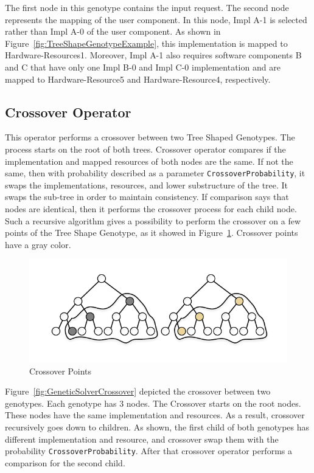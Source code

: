 The first node in this genotype contains the input request. The second node represents the mapping of the user component. In this node, Impl A-1 is selected rather than Impl A-0 of the user component. As shown in Figure~\ref{fig:TreeShapeGenotypeExample}, this implementation is mapped to Hardware-Resources1. Moreover, Impl A-1 also requires software components B and C that have only one Impl B-0 and Impl C-0 implementation and are mapped to Hardware-Resource5 and Hardware-Resource4, respectively.

\subsection{Crossover Operator}
\label{sec:GeneticSolverCrossover}

This operator performs a crossover between two Tree Shaped Genotypes. The process starts on the root of both trees. Crossover operator compares if the implementation and mapped resources of both nodes are the same. If not the same, then with probability described as a parameter \texttt{CrossoverProbability}, it swaps the implementations, resources, and lower substructure of the tree. It swaps the sub-tree in order to maintain consistency. If comparison says that nodes are identical, then it performs the crossover process for each child node. Such a recursive algorithm gives a possibility to perform the crossover on a few points of the Tree Shape Genotype, as it showed in Figure~\ref{fig:CrossoverPoints}. Crossover points have a gray color.

\begin{figure}
	\centering
	\includegraphics[width=\textwidth]{images/CrossoverPoints.pdf}
	\caption[Crossover Points]{Crossover Points}
	\label{fig:CrossoverPoints}
\end{figure}

Figure~\ref{fig:GeneticSolverCrossover} depicted the crossover between two genotypes. Each genotype has 3 nodes. The Crossover starts on the root nodes. These nodes have the same implementation and resources. As a result, crossover recursively goes down to children. As shown, the first child of both genotypes has different implementation and resource, and crossover swap them with the probability \texttt{CrossoverProbability}. After that crossover operator performs a comparison for the second child.


